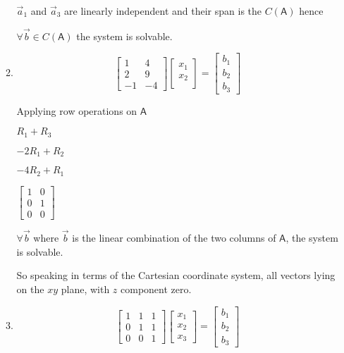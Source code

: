 \documentclass[a4paper, 11pt]{article}
\newcommand{\mat}[1]{\boldsymbol { \mathsf{#1}} }
\begin{document}
\begin{enumerate}
\begin{enumerate}
$\vec a_1$ and $\vec a_3$ are linearly independent and their span is the $C(\mat A)$ hence 

$\forall \vec b \in C(\mat A)$  the system is solvable.


\item
\[ 
\left[ \begin{array}{cc}
1  &   4 \\
2  &  9 \\
-1 & -4 
\end{array} \right]
%
\left[ \begin{array}{c}
 x_1\\
 x_2\\
\end{array} \right]
%
= \left[ \begin{array}{c}
 b_1\\
 b_2\\
 b_3 
\end{array} \right]
\]

Applying row operations on $\mat A$

\begin{center}
	
$R_1 + R_3$

$-2R_1 + R_2$

$-4R_2 + R_1$

$
\begin{bmatrix}
1 & 0 \\ 
0 & 1 \\
0 & 0
\end{bmatrix}
$	
\end{center}

$\forall \vec b$ where $\vec b$ is the linear combination of the two columns of  $\mat A$, the system is solvable.

So speaking in terms of the Cartesian coordinate system, all vectors lying on the $xy$ plane, with $z$ component zero.

\item 
\[ 
\left[ \begin{array}{ccc}
1  & 1 & 1\\
0  & 1 & 1\\
0 & 0 & 1
\end{array} \right]
%
\left[ \begin{array}{c}
 x_1\\
 x_2\\
x_3
\end{array} \right]
%
= \left[ \begin{array}{c}
 b_1\\
 b_2\\
 b_3 
\end{array} \right]
\]


\end{enumerate}
\end{enumerate}
\end{document}

